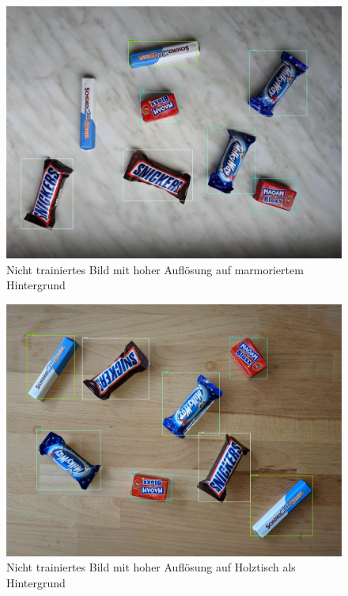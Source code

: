     \begin{figure}[H]
        \centering
        \includegraphics[angle = 90, width = \textwidth]{Bilder/models/model_comparison/efficientdet_d1_coco17_tpu-32/HD_on_marble.jpg}
        \caption{Nicht trainiertes Bild mit hoher Auflösung auf marmoriertem Hintergrund}
    \end{figure}
    
    \begin{figure}[H]
        \centering
        \includegraphics[angle = 90, width = \textwidth]{Bilder/models/model_comparison/efficientdet_d1_coco17_tpu-32/HD_on_wood.jpg}
        \caption{Nicht trainiertes Bild mit hoher Auflösung auf Holztisch als Hintergrund}
    \end{figure}
    
